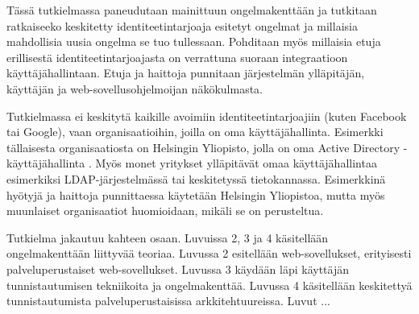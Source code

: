 Tässä tutkielmassa paneudutaan mainittuun ongelmakenttään ja tutkitaan ratkaiseeko keskitetty identiteetintarjoaja esitetyt ongelmat ja millaisia mahdollisia uusia ongelma se tuo tullessaan. Pohditaan myös millaisia etuja erillisestä identiteetintarjoajasta on verrattuna suoraan integraatioon käyttäjähallintaan. Etuja ja haittoja punnitaan järjestelmän ylläpitäjän, käyttäjän ja web-sovellusohjelmoijan näkökulmasta.

Tutkielmassa ei keskitytä kaikille avoimiin identiteetintarjoajiin (kuten Facebook tai Google), vaan organisaatioihin, joilla on oma käyttäjähallinta. Esimerkki tällaisesta organisaatiosta on Helsingin Yliopisto, jolla on oma Active Directory -käyttäjähallinta \cite{tietotekniikkaa}. Myös monet yritykset ylläpitävät omaa käyttäjähallintaa esimerkiksi LDAP-järjestelmässä tai keskitetyssä tietokannassa. Esimerkkinä hyötyjä ja haittoja punnittaessa käytetään Helsingin Yliopistoa, mutta myös muunlaiset organisaatiot huomioidaan, mikäli se on perusteltua.

Tutkielma jakautuu kahteen osaan. Luvuissa 2, 3 ja 4 käsitellään ongelmakenttään liittyvää teoriaa. Luvussa 2 esitellään web-sovellukset, erityisesti palveluperustaiset web-sovellukset. Luvussa 3 käydään läpi käyttäjän tunnistautumisen tekniikoita ja ongelmakenttää. Luvussa 4 käsitellään keskitettyä tunnistautumista palveluperustaisissa arkkitehtuureissa. Luvut ...
